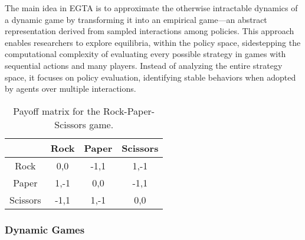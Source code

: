 \begin{flushleft}
    The main idea in EGTA is to approximate the otherwise intractable dynamics of a dynamic game by transforming it into an empirical game—an abstract representation derived from sampled interactions among policies. This approach enables researchers to explore equilibria, within the policy space, sidestepping the computational complexity of evaluating every possible strategy in games with sequential actions and many players. Instead of analyzing the entire strategy space, it focuses on policy evaluation, identifying stable behaviors when adopted by agents over multiple interactions.

    \begin{table}[t]
        \centering
        \caption{Payoff matrix for the Rock-Paper-Scissors game.}
        \vspace{0.6em}
        \label{tab:rps_payoff}
        \begin{tabular}{c|c c c}
            & Rock & Paper & Scissors \\ \hline
            Rock     & 0,0    & -1,1   & 1,-1 \\
            Paper    & 1,-1   & 0,0    & -1,1 \\
            Scissors & -1,1   & 1,-1   & 0,0 \\
        \end{tabular}
    \end{table}
    
\end{flushleft}

\subsubsection{Dynamic Games}

